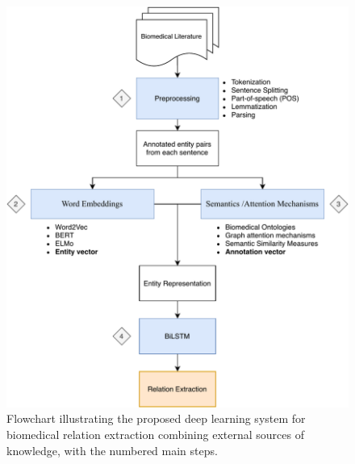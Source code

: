 \begin{figure}
\centering
\includegraphics[width=15.5cm]{images/flowchart.pdf}
\caption[Flowchart Illustrating Proposed System]{Flowchart illustrating the proposed deep learning system for biomedical relation extraction combining external sources of knowledge, with the numbered main steps.}
\label{flow}
\end{figure}


